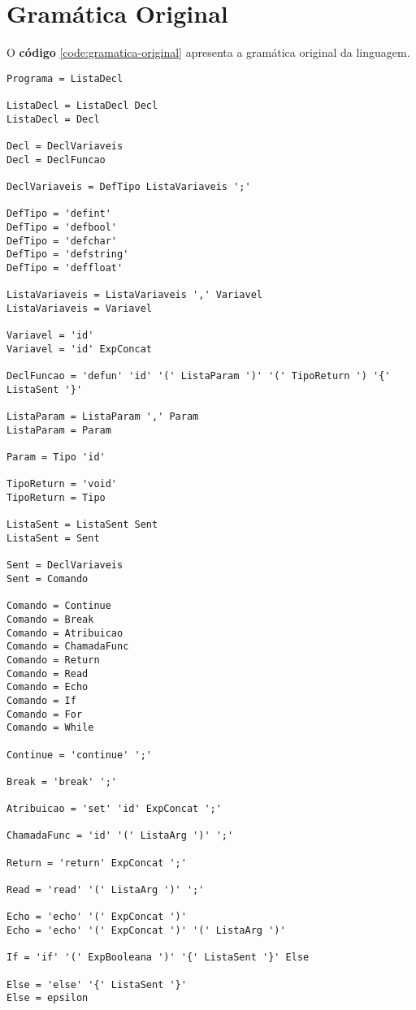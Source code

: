 \documentclass[
  12pt,				%
  oneside,			%
  a4paper,			%
  english,			%
  french,				%
  spanish,			%
  brazil,				%
]{abntex2}
\begin{document}
\chapter{Gramática Original}
\label{cha:gramatica-original}
O \textbf{código} \ref{code:gramatica-original} apresenta a gramática
original da linguagem.

\begin{lstlisting}[label={code:gramatica-original},caption={Gramática
    original da linguagem de programação LisC.},style={mystyle}]
Programa = ListaDecl

ListaDecl = ListaDecl Decl
ListaDecl = Decl

Decl = DeclVariaveis
Decl = DeclFuncao

DeclVariaveis = DefTipo ListaVariaveis ';'

DefTipo = 'defint'
DefTipo = 'defbool'
DefTipo = 'defchar'
DefTipo = 'defstring'
DefTipo = 'deffloat'

ListaVariaveis = ListaVariaveis ',' Variavel
ListaVariaveis = Variavel

Variavel = 'id'
Variavel = 'id' ExpConcat

DeclFuncao = 'defun' 'id' '(' ListaParam ')' '(' TipoReturn ') '{' ListaSent '}'

ListaParam = ListaParam ',' Param
ListaParam = Param

Param = Tipo 'id'

TipoReturn = 'void'
TipoReturn = Tipo

ListaSent = ListaSent Sent
ListaSent = Sent

Sent = DeclVariaveis
Sent = Comando

Comando = Continue
Comando = Break
Comando = Atribuicao
Comando = ChamadaFunc
Comando = Return
Comando = Read
Comando = Echo
Comando = If
Comando = For
Comando = While

Continue = 'continue' ';'

Break = 'break' ';'

Atribuicao = 'set' 'id' ExpConcat ';'

ChamadaFunc = 'id' '(' ListaArg ')' ';'

Return = 'return' ExpConcat ';'

Read = 'read' '(' ListaArg ')' ';'

Echo = 'echo' '(' ExpConcat ')'
Echo = 'echo' '(' ExpConcat ')' '(' ListaArg ')'

If = 'if' '(' ExpBooleana ')' '{' ListaSent '}' Else

Else = 'else' '{' ListaSent '}'
Else = epsilon


\end{lstlisting}
\end{document}

